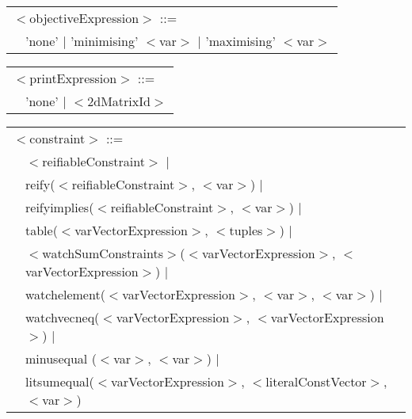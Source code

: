 \documentclass{article}
\begin{document}
\begin{small}
{\noindent
\setlength{\tabcolsep}{0mm}
\begin{tabular}{ll}
\multicolumn{2}{l}{$<$objectiveExpression$>$ ::=}\\
\hspace*{2mm} & 'none' $|$ 'minimising' $<$var$>$ $|$ 'maximising' $<$var$>$\\
\end{tabular}
\vspace*{1mm}

\noindent
\setlength{\tabcolsep}{0mm}
\begin{tabular}{ll}
\multicolumn{2}{l}{$<$printExpression$>$ ::=}\\
\hspace*{2mm} & 'none' $|$ $<$2dMatrixId$>$\\
\end{tabular}
\vspace*{1mm}

\noindent
\setlength{\tabcolsep}{0mm}
\begin{tabular}{ll}
\multicolumn{2}{l}{$<$constraint$>$ ::=}\\
\hspace*{2mm} & $<$reifiableConstraint$>$ $|$\\
               & reify($<$reifiableConstraint$>$, $<$var$>$) $|$\\
              & reifyimplies($<$reifiableConstraint$>$, $<$var$>$) $|$\\
              & table($<$varVectorExpression$>$, $<$tuples$>$) $|$\\
              & $<$watchSumConstraints$>$($<$varVectorExpression$>$, $<$varVectorExpression$>$) $|$\\
              & watchelement($<$varVectorExpression$>$, $<$var$>$, $<$var$>$) $|$\\
              & watchvecneq($<$varVectorExpression$>$, $<$varVectorExpression$>$) $|$\\
              & minusequal ($<$var$>$, $<$var$>$) $|$\\
             & litsumequal($<$varVectorExpression$>$, $<$literalConstVector$>$, $<$var$>$) \\
             
\end{tabular}
\vspace*{1mm}

}
\end{small}
\end{document}
